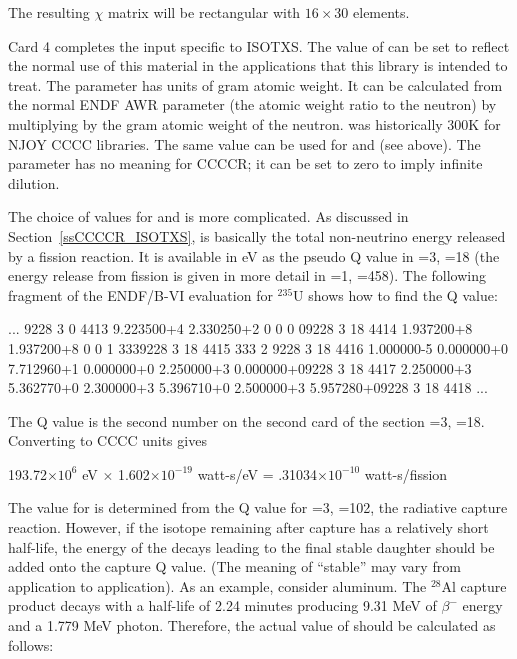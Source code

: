 \noindent
The resulting $\chi$ matrix will be rectangular with $16\times 30$
elements.

Card 4 completes the input specific to ISOTXS.  The value of 
can be set to reflect the normal use of this material in the applications
that this library is intended to treat.  The  parameter
has units of gram atomic weight.  It can be calculated from the normal
ENDF AWR parameter (the atomic weight ratio to the neutron) by
multiplying by the gram atomic weight of the neutron.  
was historically 300K for NJOY CCCC libraries.  The same value can be used
for  and  (see above).  The 
parameter has no meaning for CCCCR; it can be set to zero to imply
infinite dilution.

The choice of values for  and  is more
complicated.  As discussed in Section~\ref{ssCCCCR_ISOTXS}, 
is basically
the total non-neutrino energy released by a fission reaction.  It
is available in eV as the pseudo Q value in =3, =18
(the energy release from fission is given in more detail in =1,
=458).  The following fragment of the ENDF/B-VI evaluation for
$^{235}$U shows how to find the Q value:

\footnotesize
\begin{ccode}
  ...
                                                                  9228 3  0 4413
 9.223500+4 2.330250+2          0          0          0          09228 3 18 4414
 1.937200+8 1.937200+8          0          0          1        3339228 3 18 4415
        333          2                                            9228 3 18 4416
 1.000000-5 0.000000+0 7.712960+1 0.000000+0 2.250000+3 0.000000+09228 3 18 4417
 2.250000+3 5.362770+0 2.300000+3 5.396710+0 2.500000+3 5.957280+09228 3 18 4418
  ...

\end{ccode}
\normalsize

\noindent
The Q value is the second number on the second card of the section
=3, =18.  Converting to CCCC units gives

\noindent
\begin{center}

193.72${\times}10^6$ eV $\times$ 1.602${\times}10^{-19}$ watt-s/eV
     = .31034${\times}10^{-10}$ watt-s/fission

\end{center}
\noindent
The value for  is determined from the Q value for
=3, =102,
the radiative capture reaction.  However, if the isotope remaining after
capture has a relatively short half-life, the energy of the decays leading
to the final stable daughter should be added onto the capture Q value.
(The meaning of ``stable'' may vary from application to application).
As an example, consider aluminum.  The $^{28}$Al capture product
decays with a half-life of 2.24 minutes producing 9.31 MeV of
$\beta^-$ energy and a 1.779 MeV photon.  Therefore, the actual
value of  should be calculated as follows:

